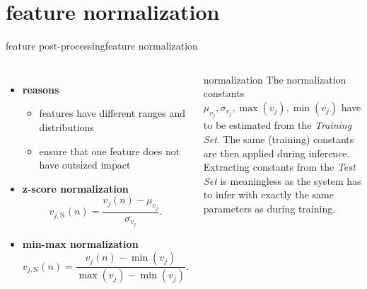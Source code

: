     \section[normalization]{feature normalization}
		\begin{frame}{feature post-processing}{feature normalization}
            \vspace{-3mm}
            \begin{columns}
            \begin{itemize}
                \item \textbf{reasons}
                    \begin{itemize}
                        \item   features have different ranges and distributions
                        \item   ensure that one feature does not have outsized impact
                    \end{itemize}
                \smallskip
                \item   \textbf{z-score normalization}
                    \begin{equation*}\label{eq:featnorm_zscore}
                        v_{j,\mathrm{N}}(n) = \frac{v_j(n) - \mu_{v_j}}{\sigma_{v_j}}.
                    \end{equation*}
                \item   \textbf{min-max normalization}
                    \begin{equation*}\label{eq:featnorm_minmax}
                        v_{j,\mathrm{N}}(n) = \frac{v_j(n) - \min(v_j)}{\max(v_j) - \min(v_j)}.
                    \end{equation*}
            \end{itemize}
            \begin{block}{normalization}
                The normalization constants $\mu_{v_j},\sigma_{v_j},\max(v_j),\min(v_j)$ have to be estimated from the \emph{{Training Set}}. The same (training) constants are then applied during inference. Extracting constants from the \emph{Test Set} is meaningless as the system has to infer with exactly the same parameters as during training. 
            \end{block}
            \end{columns}
		\end{frame}

